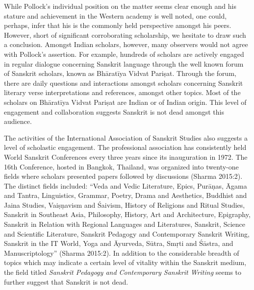 While Pollock’s individual position on the matter seems clear enough and his stature and achievement in the Western academy is well noted, one could, perhaps, infer that his is the commonly held perspective amongst his peers. However, short of significant corroborating scholarship, we hesitate to draw such a conclusion. Amongst Indian scholars, however, many observers would not agree with Pollock’s assertion. For example, hundreds of scholars are actively engaged in regular dialogue concerning Sanskrit language through the well known forum of Sanskrit scholars, known as Bhāratīya Vidvat Pariṣat. Through the forum, there are daily questions and interactions amongst scholars concerning Sanskrit literary verse interpretations and references, amongst other topics. Most of the scholars on Bhāratīya Vidvat Pariṣat are Indian or of Indian origin. This level of engagement and collaboration suggests Sanskrit is not dead amongst this audience. 

The activities of the International Association of Sanskrit Studies also suggests a level of scholastic engagement. The professional association has consistently held World Sanskrit Conferences every three years since its inauguration in 1972. The 16th Conference, hosted in Bangkok, Thailand, was organized into twenty-one fields where scholars presented papers followed by discussions (Sharma 2015:2). The distinct fields included: “Veda and Vedic Literature, Epics, Purāṇas, Āgama and Tantra, Linguistics, Grammar, Poetry, Drama and Aesthetics, Buddhist and Jaina Studies, Vaiṣṇavism and Śaivism, History of Religions and Ritual Studies, Sanskrit in Southeast Asia, Philosophy, History, Art and Architecture, Epigraphy, Sanskrit in Relation with Regional Languages and Literatures, Sanskrit, Science and Scientific Literature, Sanskrit Pedagogy and Contemporary Sanskrit Writing, Sanskrit in the IT World, Yoga and Āyurveda, Sūtra, Smṛti and Śāstra, and Manuscriptology” (Sharma 2015:2). In addition to the considerable breadth of topics which may indicate a certain level of vitality within the Sanskrit medium, the field titled {\sl Sanskrit Pedagogy and Contemporary Sanskrit Writing} seems to further suggest that Sanskrit is not dead.

